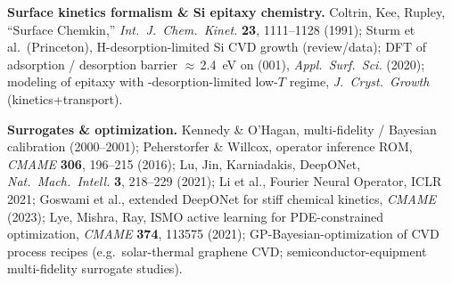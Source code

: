\documentclass[11pt]{article}
\begin{document}
\textbf{Surface kinetics formalism \& Si epitaxy chemistry.}
Coltrin, Kee, Rupley, ``Surface Chemkin,'' \emph{Int.\ J.\ Chem.\ Kinet.} \textbf{23}, 1111--1128 (1991);
Sturm et al.\ (Princeton), H-desorption-limited Si CVD growth (review/data);
DFT of  adsorption /  desorption barrier $\approx$\,\SI{2.4}{eV} on (001), \emph{Appl.\ Surf.\ Sci.} (2020);
modeling of  epitaxy with -desorption-limited low-$T$ regime, \emph{J.\ Cryst.\ Growth} (kinetics+transport).

\textbf{Surrogates \& optimization.}
Kennedy \& O'Hagan, multi-fidelity / Bayesian calibration (2000--2001);
Peherstorfer \& Willcox, operator inference ROM, \emph{CMAME} \textbf{306}, 196--215 (2016);
Lu, Jin, Karniadakis, DeepONet, \emph{Nat.\ Mach.\ Intell.} \textbf{3}, 218--229 (2021);
Li et al., Fourier Neural Operator, ICLR 2021;
Goswami et al., extended DeepONet for stiff chemical kinetics, \emph{CMAME} (2023);
Lye, Mishra, Ray, ISMO active learning for PDE-constrained optimization, \emph{CMAME} \textbf{374}, 113575 (2021);
GP-Bayesian-optimization of CVD process recipes (e.g.\ solar-thermal graphene CVD; semiconductor-equipment multi-fidelity surrogate studies).
\normalsize
\end{document}
